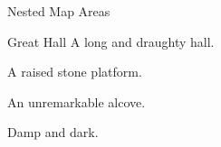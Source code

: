 \begin{ExampleBlock}{Nested Map Areas}
\begin{RpgMap}[header-offset=2]
    \begin{RpgArea}{Great Hall}
        A long and draughty hall.

         A raised stone platform.

        \area An unremarkable alcove.
    \end{RpgArea}

     Damp and dark.
\end{RpgMap}


\end{ExampleBlock}

